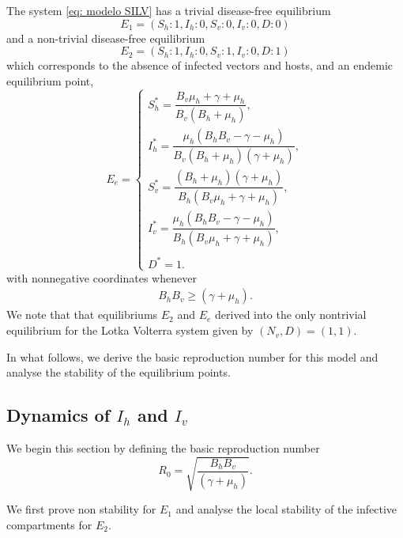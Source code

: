 \documentclass{amsart}
\theoremstyle{definition}
\theoremstyle{remark}
\numberwithin{equation}{section}
\begin{document}
	The system \eqref{eq: modelo SILV} has a trivial disease-free equilibrium
	\begin{equation*}\label{eq: free-of-dis-1}
	E_1=( S_h: 1, I_h: 0, S_v:0, I_v: 0, D:0)
	\end{equation*}
	and a non-trivial disease-free equilibrium  
		\begin{equation*}\label{eq: free-of-dis-2}
	E_2=( S_h: 1 , I_h: 0, S_v: 1 , I_v: 0, D:1 )
	\end{equation*}
	which corresponds to the absence of infected vectors and hosts, and an endemic equilibrium point,  
	$$
	E_e=\begin{cases}
		S_h^* = \dfrac{B_v \mu_h + \gamma + \mu_h}{B_v (B_h + \mu_h)}, \\
		I_h^* = \dfrac{\mu_h (B_h B_v - \gamma - \mu_h)}{B_v (B_h + \mu_h)(\gamma + \mu_h)}, \\
		S_v^* = \dfrac{(B_h + \mu_h)(\gamma + \mu_h)}{B_h (B_v \mu_h + \gamma + \mu_h)},\\
		I_v^* = \dfrac{\mu_h (B_h B_v - \gamma - \mu_h)}{B_h (B_v \mu_h + \gamma + \mu_h)}, \\
		\\
		D^* = 1.
	\end{cases}
	$$
	with nonnegative coordinates whenever 
	\begin{align}
		\label{eq: condicion_EE}
		B_hB_v \ge  (\gamma  +\mu_h).
	\end{align}
	We note that that equilibriums $E_2$ and $E_e$ derived into the only nontrivial equilibrium for the Lotka Volterra system given by $(N_v,D)=(1,1)$.

In what follows, we derive the basic reproduction number for this model and analyse the stability of the equilibrium points.

\subsection{Dynamics of $I_h$ and $I_v$}

We begin this section by defining 
the basic reproduction number
\begin{equation}\label{R0}
R_0=\sqrt{\frac{B_h B_v }{ (\gamma + \mu_h)  }}.
\end{equation}

We first prove non stability for $E_1$ and analyse the local stability of the infective compartments for $E_2$.
\end{document}
